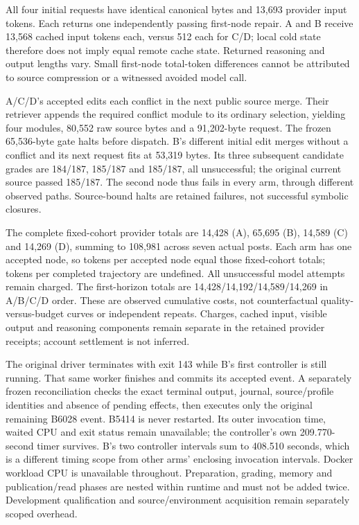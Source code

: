 All four initial requests have identical canonical bytes and 13,693 provider
input tokens. Each returns one independently passing first-node repair. A and
B receive 13,568 cached input tokens each, versus 512 each for C/D; local cold
state therefore does not imply equal remote cache state. Returned reasoning
and output lengths vary. Small first-node total-token differences cannot be
attributed to source compression or a witnessed avoided model call.

A/C/D's accepted edits each conflict in the next public source merge.
Their retriever appends the required conflict module to its ordinary selection,
yielding four modules, 80,552 raw source bytes and a 91,202-byte request. The
frozen 65,536-byte gate halts before dispatch. B's different initial edit
merges without a conflict and its next request fits at 53,319 bytes. Its
three subsequent candidate grades are 184/187, 185/187 and 185/187, all
unsuccessful; the original current source passed 185/187. The second node
thus fails in every arm, through different observed paths. Source-bound
halts are retained failures, not successful symbolic closures.

The complete fixed-cohort provider totals are 14,428 (A), 65,695 (B),
14,589 (C) and 14,269 (D), summing to 108,981 across seven actual posts.
Each arm has one accepted node, so tokens per accepted node equal those
fixed-cohort totals; tokens per completed trajectory are undefined. All
unsuccessful model attempts remain charged. The first-horizon totals are
14,428/14,192/14,589/14,269 in A/B/C/D order. These are observed cumulative
costs, not counterfactual quality-versus-budget curves or independent repeats.
Charges, cached input, visible output and reasoning components remain separate
in the retained provider receipts; account settlement is not inferred.

The original driver terminates with exit 143 while B's first controller is
still running. That same worker finishes and commits its accepted event.
A separately frozen reconciliation checks the exact terminal output, journal,
source/profile identities and absence of pending effects, then executes only
the original remaining B6028 event. B5414 is never restarted. Its outer
invocation time, waited CPU and exit status remain unavailable; the controller's
own 209.770-second timer survives. B's two controller intervals sum to
408.510 seconds, which is a different timing scope from other arms' enclosing
invocation intervals. Docker workload CPU is unavailable throughout. Preparation,
grading, memory and publication/read phases are nested within runtime and must
not be added twice. Development qualification and source/environment acquisition
remain separately scoped overhead.

